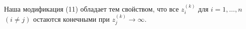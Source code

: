 \documentclass[a4paper,12pt]{article}
\begin{document}
Наша модификация (11) обладает тем свойством, что все $z_{i}^{(k)}$ для $i=1,\dots,n$ $(i\neq j)$ остаются конечными при $z_{j}^{(k)} \to \infty$.



    
    
\end{document}
